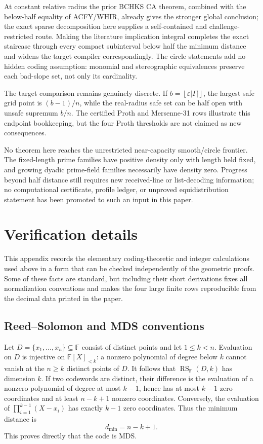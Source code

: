 \documentclass[11pt,a4paper]{amsart}
\numberwithin{equation}{section}
\theoremstyle{remark}
\DeclareMathOperator{\RS}{RS}
\newcommand{\F}{\mathbb F}
\newcommand{\eps}{\varepsilon}
\newcommand{\abs}[1]{\lvert #1\rvert}
\newcommand{\floor}[1]{\left\lfloor #1\right\rfloor}
\begin{document}
At constant relative radius the prior BCHKS CA theorem, combined with
the below-half equality of ACFY/WHIR, already gives the stronger global
conclusion; the exact sparse decomposition here supplies a self-contained
and challenge-restricted route.  Making the literature implication
integral completes the exact staircase through every compact subinterval
below half the minimum distance and widens the target compiler
correspondingly.  The circle statements add no hidden coding assumption:
monomial and stereographic equivalences preserve each bad-slope set, not
only its cardinality.

The target comparison remains genuinely discrete.  If
\(b=\floor{\eps\abs\Gamma}\), the largest safe grid point is
\((b-1)/n\), while the real-radius safe set can be half open with unsafe
supremum \(b/n\).  The certified Proth and Mersenne-31 rows illustrate
this endpoint bookkeeping, but the four Proth thresholds are not claimed
as new consequences.

No theorem here reaches the unrestricted near-capacity smooth/circle
frontier.  The fixed-length prime families have positive density only
with length held fixed, and growing dyadic prime-field families
necessarily have density zero.  Progress beyond half distance still
requires new received-line or list-decoding information; no computational
certificate, profile ledger, or unproved equidistribution statement has
been promoted to such an input in this paper.

\appendix
\section{Verification details}\label{sec:verification-details}

This appendix records the elementary coding-theoretic and integer
calculations used above in a form that can be checked independently of the
geometric proofs.  Some of these facts are standard, but including their
short derivations fixes all normalization conventions and makes the four
large finite rows reproducible from the decimal data printed in the paper.

\subsection{Reed--Solomon and MDS conventions}

Let \(D=\{x_1,\ldots,x_n\}\subseteq\F\) consist of distinct points and
let \(1\le k<n\).  Evaluation on \(D\) is injective on
\(\F[X]_{<k}\): a nonzero polynomial of degree below \(k\) cannot vanish
at the \(n\ge k\) distinct points of \(D\).  It follows that
\(\RS_\F(D,k)\) has dimension \(k\).  If two codewords are distinct,
their difference is the evaluation of a nonzero polynomial of degree at
most \(k-1\), hence has at most \(k-1\) zero coordinates and at least
\(n-k+1\) nonzero coordinates.  Conversely, the evaluation of
\(\prod_{i=1}^{k-1}(X-x_i)\) has exactly \(k-1\) zero coordinates.
Thus the minimum distance is
\[
                         d_{\min}=n-k+1.
\]
This proves directly that the code is MDS.
\end{document}
